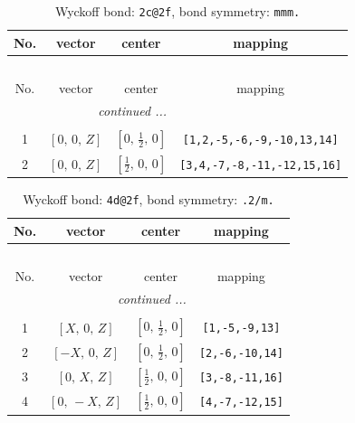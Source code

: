 \documentclass[fleqn,8pt]{jsarticle}
\begin{document}
\begin{longtable}{cccc}
\caption{Wyckoff bond: {\tt 2c@2f}, bond symmetry: {\tt mmm.}}
 \\
 \hline \hline
No. & vector & center & mapping \\ \hline \endfirsthead

\multicolumn{3}{l}{\tablename\ \thetable{}} \\
 \hline \hline
No. & vector & center & mapping \\ \hline \endhead

 \hline \hline
\multicolumn{3}{r}{\footnotesize\it continued ...} \\ \endfoot

 \hline \hline
\multicolumn{3}{r}{} \\ \endlastfoot

1 & $\left[ 0,\, 0,\, Z \right]$ & $\left[ 0,\, \frac{1}{2},\, 0 \right]$ & {\tt [1,2,-5,-6,-9,-10,13,14]} \\ \hline
2 & $\left[ 0,\, 0,\, Z \right]$ & $\left[ \frac{1}{2},\, 0,\, 0 \right]$ & {\tt [3,4,-7,-8,-11,-12,15,16]} \\
\end{longtable}
\renewcommand{\arraystretch}{1.2}
\begin{longtable}{cccc}
\caption{Wyckoff bond: {\tt 4d@2f}, bond symmetry: {\tt .2/m.}}
 \\
 \hline \hline
No. & vector & center & mapping \\ \hline \endfirsthead

\multicolumn{3}{l}{\tablename\ \thetable{}} \\
 \hline \hline
No. & vector & center & mapping \\ \hline \endhead

 \hline \hline
\multicolumn{3}{r}{\footnotesize\it continued ...} \\ \endfoot

 \hline \hline
\multicolumn{3}{r}{} \\ \endlastfoot

1 & $\left[ X,\, 0,\, Z \right]$ & $\left[ 0,\, \frac{1}{2},\, 0 \right]$ & {\tt [1,-5,-9,13]} \\ \hline
2 & $\left[ - X,\, 0,\, Z \right]$ & $\left[ 0,\, \frac{1}{2},\, 0 \right]$ & {\tt [2,-6,-10,14]} \\ \hline
3 & $\left[ 0,\, X,\, Z \right]$ & $\left[ \frac{1}{2},\, 0,\, 0 \right]$ & {\tt [3,-8,-11,16]} \\ \hline
4 & $\left[ 0,\, - X,\, Z \right]$ & $\left[ \frac{1}{2},\, 0,\, 0 \right]$ & {\tt [4,-7,-12,15]} \\
\end{longtable}
\end{document}
